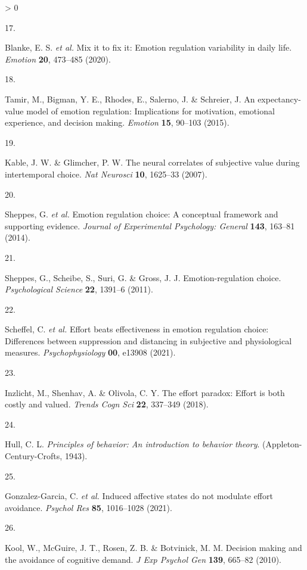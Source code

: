 \documentclass[
  english,
  man,floatsintext]{apa6}
\newlength{\cslhangindent}
\newlength{\csllabelwidth}
\newenvironment{CSLReferences}[2] %
 {%
  \setlength{\parindent}{0pt}
  \ifodd #1 \everypar{\setlength{\hangindent}{\cslhangindent}}\ignorespaces\fi
  \ifnum #2 > 0
  \setlength{\parskip}{#2\baselineskip}
  \fi
 }%
 {}
\newcommand{\CSLLeftMargin}[1]{\parbox[t]{\csllabelwidth}{#1}}
\newcommand{\CSLRightInline}[1]{\parbox[t]{\linewidth - \csllabelwidth}{#1}\break}
\begin{document}
\begin{CSLReferences}{0}{0}
\leavevmode\hypertarget{ref-Blanke2020}{}%
\CSLLeftMargin{17. }
\CSLRightInline{Blanke, E. S. \emph{et al.} Mix it to fix it: Emotion regulation variability in daily life. \emph{Emotion} \textbf{20}, 473--485 (2020).}

\leavevmode\hypertarget{ref-Tamir2015}{}%
\CSLLeftMargin{18. }
\CSLRightInline{Tamir, M., Bigman, Y. E., Rhodes, E., Salerno, J. \& Schreier, J. An expectancy-value model of emotion regulation: Implications for motivation, emotional experience, and decision making. \emph{Emotion} \textbf{15}, 90--103 (2015).}

\leavevmode\hypertarget{ref-Kable2007}{}%
\CSLLeftMargin{19. }
\CSLRightInline{Kable, J. W. \& Glimcher, P. W. The neural correlates of subjective value during intertemporal choice. \emph{Nat Neurosci} \textbf{10}, 1625--33 (2007).}

\leavevmode\hypertarget{ref-Sheppes2014}{}%
\CSLLeftMargin{20. }
\CSLRightInline{Sheppes, G. \emph{et al.} Emotion regulation choice: A conceptual framework and supporting evidence. \emph{Journal of Experimental Psychology: General} \textbf{143}, 163--81 (2014).}

\leavevmode\hypertarget{ref-Sheppes2011}{}%
\CSLLeftMargin{21. }
\CSLRightInline{Sheppes, G., Scheibe, S., Suri, G. \& Gross, J. J. Emotion-regulation choice. \emph{Psychological Science} \textbf{22}, 1391--6 (2011).}

\leavevmode\hypertarget{ref-Scheffel2021}{}%
\CSLLeftMargin{22. }
\CSLRightInline{Scheffel, C. \emph{et al.} Effort beats effectiveness in emotion regulation choice: Differences between suppression and distancing in subjective and physiological measures. \emph{Psychophysiology} \textbf{00}, e13908 (2021).}

\leavevmode\hypertarget{ref-Inzlicht2018}{}%
\CSLLeftMargin{23. }
\CSLRightInline{Inzlicht, M., Shenhav, A. \& Olivola, C. Y. The effort paradox: Effort is both costly and valued. \emph{Trends Cogn Sci} \textbf{22}, 337--349 (2018).}

\leavevmode\hypertarget{ref-Hull1943}{}%
\CSLLeftMargin{24. }
\CSLRightInline{Hull, C. L. \emph{Principles of behavior: An introduction to behavior theory}. (Appleton-Century-Crofts, 1943).}

\leavevmode\hypertarget{ref-Gonzalez-Garcia2021}{}%
\CSLLeftMargin{25. }
\CSLRightInline{Gonzalez-Garcia, C. \emph{et al.} Induced affective states do not modulate effort avoidance. \emph{Psychol Res} \textbf{85}, 1016--1028 (2021).}

\leavevmode\hypertarget{ref-Kool2010}{}%
\CSLLeftMargin{26. }
\CSLRightInline{Kool, W., McGuire, J. T., Rosen, Z. B. \& Botvinick, M. M. Decision making and the avoidance of cognitive demand. \emph{J Exp Psychol Gen} \textbf{139}, 665--82 (2010).}


\end{CSLReferences}
\end{document}
